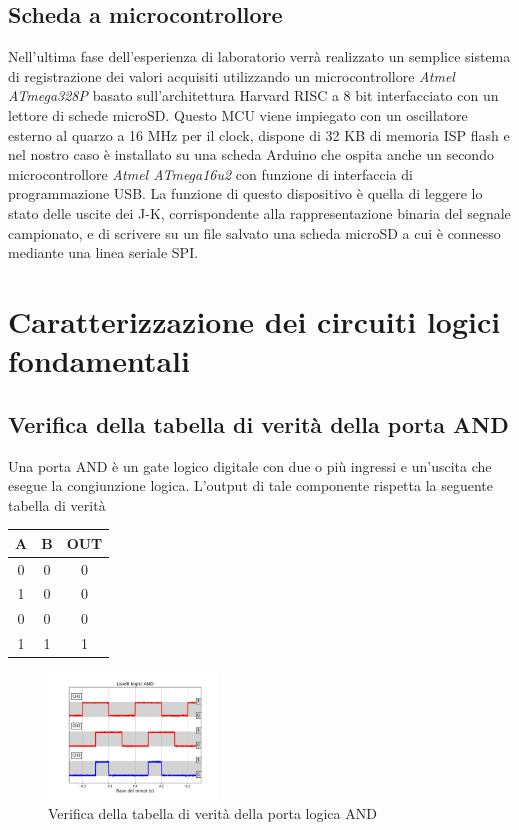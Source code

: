 \documentclass[journal]{IEEEtran}
\begin{document}
\subsection{Scheda a microcontrollore}
Nell'ultima fase dell'esperienza di laboratorio verrà realizzato un semplice sistema di registrazione dei valori acquisiti utilizzando un microcontrollore \textit{Atmel ATmega328P} basato sull'architettura Harvard RISC a 8 bit interfacciato con un lettore di schede microSD. Questo MCU viene impiegato con un oscillatore esterno al quarzo a 16 MHz per il clock, dispone di 32 KB di memoria ISP flash e nel nostro caso è installato su una scheda Arduino che ospita anche un secondo microcontrollore \textit{Atmel ATmega16u2} con funzione di interfaccia di programmazione USB. La funzione di questo dispositivo è quella di leggere lo stato delle uscite dei J-K, corrispondente alla rappresentazione binaria del segnale campionato, e di scrivere su un file salvato una scheda microSD a cui è connesso mediante una linea seriale SPI.


\section{Caratterizzazione dei circuiti logici fondamentali}

\subsection{Verifica della tabella di verità della porta AND}
Una porta AND è un gate logico digitale con due o più ingressi e un'uscita che esegue la congiunzione logica. L'output di tale componente rispetta la seguente tabella di verità
\begin{center}
\begin{tabular}{ |c|c|c| } 
 \hline
 A & B & OUT \\ \hline 
 0 & 0 & 0 \\ \hline
 1 & 0 & 0 \\ \hline
 0 & 0 & 0 \\ \hline
 1 & 1 & 1 \\ \hline
 
 \hline
\end{tabular}
\end{center}
\begin{figure}[H]%
\begin{center}
\includegraphics[width=0.40\textwidth]{analysis/output/AND-all.pdf}
\caption{Verifica della tabella di verità della porta logica AND}
\label{fig:graph_ring_oscillator}
\end{center}
\end{figure}
\end{document}
